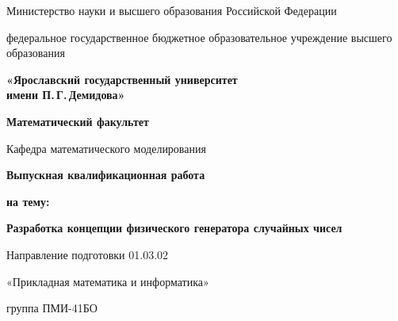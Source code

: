 \begin{titlepage}
\thispagestyle{empty}
\centering
\singlespacing
\normalfont

{\small
Министерство науки и высшего образования Российской Федерации\par\vspace{0.5em}
федеральное государственное бюджетное образовательное учреждение высшего образования\par\vspace{0.5em}
{\large\bfseries «Ярославский государственный университет\\
имени П.\,Г.\,Демидова»}\par\vspace{0.7em}
\bfseries Математический факультет\par\vspace{0.35em}
{\mdseries Кафедра математического моделирования}%
}

\vspace{1.8cm}

{\large\bfseries Выпускная квалификационная работа}\par\vspace{1.1em}

{\large\bfseries на тему:}\par\vspace{0.55em}
{\Large\bfseries Разработка концепции физического генератора случайных чисел\par}

\vspace{1.1cm}

{\large
Направление подготовки 01.03.02\par\vspace{0.25em}
«Прикладная математика и информатика»\par\vspace{0.55em}
группа ПМИ-41БО%
}

\vfill

\newcommand{\crsSignBlock}[1]{%
  \underline{\hspace{2.9cm}}\ /\ \makebox[3.2cm][l]{#1}\par
  \makebox[2.9cm][c]{\emph{(подпись)}}\hspace{1.1em}\makebox[3.2cm][c]{\emph{(Ф.\,И.\,О.)}}%
}


\end{titlepage}
